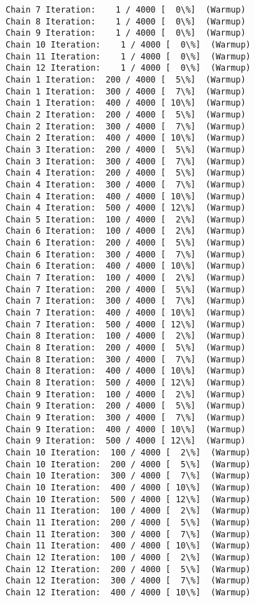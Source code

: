 \documentclass[11pt]{article}
\begin{document}
    \begin{Verbatim}[commandchars=\\\{\}]
Chain 7 Iteration:    1 / 4000 [  0\%]  (Warmup)
Chain 8 Iteration:    1 / 4000 [  0\%]  (Warmup)
Chain 9 Iteration:    1 / 4000 [  0\%]  (Warmup)
Chain 10 Iteration:    1 / 4000 [  0\%]  (Warmup)
Chain 11 Iteration:    1 / 4000 [  0\%]  (Warmup)
Chain 12 Iteration:    1 / 4000 [  0\%]  (Warmup)
Chain 1 Iteration:  200 / 4000 [  5\%]  (Warmup)
Chain 1 Iteration:  300 / 4000 [  7\%]  (Warmup)
Chain 1 Iteration:  400 / 4000 [ 10\%]  (Warmup)
Chain 2 Iteration:  200 / 4000 [  5\%]  (Warmup)
Chain 2 Iteration:  300 / 4000 [  7\%]  (Warmup)
Chain 2 Iteration:  400 / 4000 [ 10\%]  (Warmup)
Chain 3 Iteration:  200 / 4000 [  5\%]  (Warmup)
Chain 3 Iteration:  300 / 4000 [  7\%]  (Warmup)
Chain 4 Iteration:  200 / 4000 [  5\%]  (Warmup)
Chain 4 Iteration:  300 / 4000 [  7\%]  (Warmup)
Chain 4 Iteration:  400 / 4000 [ 10\%]  (Warmup)
Chain 4 Iteration:  500 / 4000 [ 12\%]  (Warmup)
Chain 5 Iteration:  100 / 4000 [  2\%]  (Warmup)
Chain 6 Iteration:  100 / 4000 [  2\%]  (Warmup)
Chain 6 Iteration:  200 / 4000 [  5\%]  (Warmup)
Chain 6 Iteration:  300 / 4000 [  7\%]  (Warmup)
Chain 6 Iteration:  400 / 4000 [ 10\%]  (Warmup)
Chain 7 Iteration:  100 / 4000 [  2\%]  (Warmup)
Chain 7 Iteration:  200 / 4000 [  5\%]  (Warmup)
Chain 7 Iteration:  300 / 4000 [  7\%]  (Warmup)
Chain 7 Iteration:  400 / 4000 [ 10\%]  (Warmup)
Chain 7 Iteration:  500 / 4000 [ 12\%]  (Warmup)
Chain 8 Iteration:  100 / 4000 [  2\%]  (Warmup)
Chain 8 Iteration:  200 / 4000 [  5\%]  (Warmup)
Chain 8 Iteration:  300 / 4000 [  7\%]  (Warmup)
Chain 8 Iteration:  400 / 4000 [ 10\%]  (Warmup)
Chain 8 Iteration:  500 / 4000 [ 12\%]  (Warmup)
Chain 9 Iteration:  100 / 4000 [  2\%]  (Warmup)
Chain 9 Iteration:  200 / 4000 [  5\%]  (Warmup)
Chain 9 Iteration:  300 / 4000 [  7\%]  (Warmup)
Chain 9 Iteration:  400 / 4000 [ 10\%]  (Warmup)
Chain 9 Iteration:  500 / 4000 [ 12\%]  (Warmup)
Chain 10 Iteration:  100 / 4000 [  2\%]  (Warmup)
Chain 10 Iteration:  200 / 4000 [  5\%]  (Warmup)
Chain 10 Iteration:  300 / 4000 [  7\%]  (Warmup)
Chain 10 Iteration:  400 / 4000 [ 10\%]  (Warmup)
Chain 10 Iteration:  500 / 4000 [ 12\%]  (Warmup)
Chain 11 Iteration:  100 / 4000 [  2\%]  (Warmup)
Chain 11 Iteration:  200 / 4000 [  5\%]  (Warmup)
Chain 11 Iteration:  300 / 4000 [  7\%]  (Warmup)
Chain 11 Iteration:  400 / 4000 [ 10\%]  (Warmup)
Chain 12 Iteration:  100 / 4000 [  2\%]  (Warmup)
Chain 12 Iteration:  200 / 4000 [  5\%]  (Warmup)
Chain 12 Iteration:  300 / 4000 [  7\%]  (Warmup)
Chain 12 Iteration:  400 / 4000 [ 10\%]  (Warmup)

\end{Verbatim}
\end{document}
